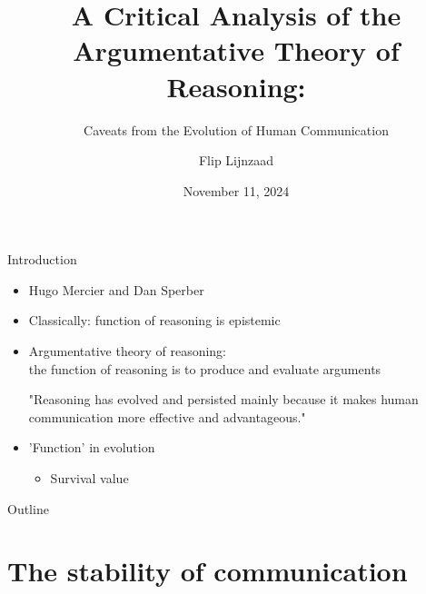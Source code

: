 \documentclass[xcolor=table]{beamer}       %
\title[A Critical Analysis of the ATR]{A Critical Analysis of the Argumentative Theory of Reasoning:}
\subtitle{Caveats from the Evolution of Human Communication}
\author{Flip Lijnzaad}
\date{November 11, 2024}
\begin{document}
\maketitle

\begin{frame}{Introduction}
    \begin{itemize}
        \item Hugo Mercier and Dan Sperber
        \item Classically: function of reasoning is epistemic
        \item \alert{Argumentative} theory of reasoning:
            \\ the function of reasoning is to produce and evaluate arguments
    \begin{block}{\citet[p.~60]{MS11}}
        "Reasoning has evolved and persisted mainly because it makes human communication more effective and advantageous."
    \end{block}
    \end{itemize}
    \pause
    \begin{itemize}
        \item 'Function' in evolution
            \begin{itemize}
                \item Survival value
            \end{itemize}
    \end{itemize}
\end{frame}

\begin{frame}{Outline}
    \tableofcontents
\end{frame}

\section{The stability of communication}
\end{document}
